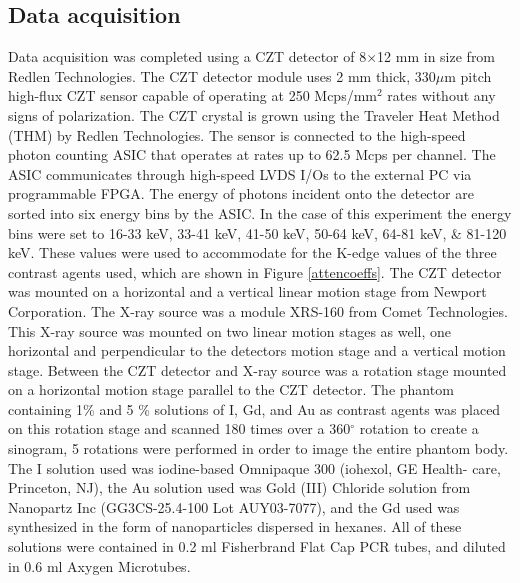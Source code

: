 \documentclass[journal, a4paper]{IEEEtran}
\begin{document}
\subsection{Data acquisition}
Data acquisition was completed using a CZT detector of 8$\times$12 mm in size from Redlen Technologies. The CZT detector module uses 2 mm thick, 330$\mu$m pitch high-flux CZT sensor capable of operating at 250 Mcps/mm$^2$ rates without any signs of polarization. The CZT crystal is grown using the Traveler Heat Method (THM) by Redlen Technologies. The sensor is connected to the high-speed photon counting ASIC that operates at rates up to 62.5 Mcps per channel. The ASIC communicates through high-speed LVDS I/Os to the external PC via programmable FPGA. The energy of photons incident onto the detector are sorted into six energy bins by the ASIC. In the case of this experiment the energy bins were set to 16-33 keV, 33-41 keV, 41-50 keV, 50-64 keV, 64-81 keV, \& 81-120 keV. These values were used to accommodate for the K-edge values of the three contrast agents used, which are shown in Figure \ref{attencoeffs}.
\newline
\indent The CZT detector was mounted on a horizontal and a vertical linear motion stage from Newport Corporation. The X-ray source was a module XRS-160 from Comet Technologies. This X-ray source was mounted on two linear motion stages as well, one horizontal and perpendicular to the detectors motion stage and a vertical motion stage. Between the CZT detector and X-ray source was a rotation stage mounted on a horizontal motion stage parallel to the CZT detector. The phantom containing 1\% and 5 \% solutions of I, Gd, and Au as contrast agents was placed on this rotation stage and scanned 180 times over a 360$^\circ$ rotation to create a sinogram, 5 rotations were performed in order to image the entire phantom body. The I solution used was iodine-based Omnipaque 300 (iohexol, GE Health- care, Princeton, NJ), the Au solution used was Gold (III) Chloride solution from Nanopartz Inc (GG3CS-25.4-100 Lot AUY03-7077), and the Gd used was synthesized in the form of nanoparticles dispersed in hexanes\cite{gadolNPs}. All of these solutions were contained in 0.2 ml Fisherbrand Flat Cap PCR tubes, and diluted in 0.6 ml Axygen Microtubes.
\end{document}
